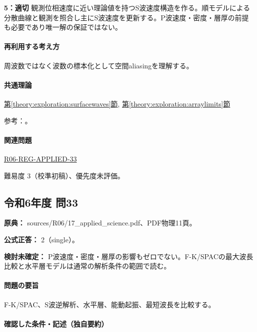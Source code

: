\noindent\textbf{5：適切} 観測位相速度に近い理論値を持つS波速度構造を作る。順モデルによる分散曲線と観測を照合し主にS波速度を更新する。P波速度・密度・層厚の前提も必要であり唯一解の保証ではない。\par

\paragraph{再利用する考え方} 周波数ではなく波数の標本化として空間aliasingを理解する。

\paragraph{共通理論} \hyperref[theory:exploration:surfacewaves]{第\ref*{theory:exploration:surfacewaves}節}, \hyperref[theory:exploration:arraylimits]{第\ref*{theory:exploration:arraylimits}節}

\par 参考：\cite{epa_surfacewaves,xia_rayleigh1999,japansea_spac2017,array_limits2002}。

\paragraph{関連問題} \hyperref[q:r06-reg-applied-33]{R06-REG-APPLIED-33}

\par 難易度 3（校準初稿）、優先度未評価。

\subsection{令和6年度 問33}
\label{q:r06-reg-applied-33}

\noindent\textbf{原典：} sources/R06/17\_applied\_science.pdf、PDF物理11頁。

\textbf{公式正答：} 2（single）。

\par\textbf{検討未確定：} P波速度・密度・層厚の影響もゼロでない。F-K/SPACの最大波長比較と水平層モデルは通常の解析条件の範囲で読む。

\paragraph{問題の要旨} F-K/SPAC、S波逆解析、水平層、能動起振、最短波長を比較する。

\paragraph{確認した条件・記述（独自要約）}\mbox{}\par


